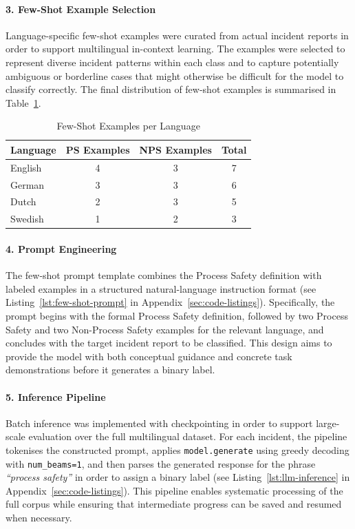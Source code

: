 \documentclass[11pt, titlepage, bibliography=totoc]{scrreprt}
\begin{document}
\paragraph{3. Few-Shot Example Selection}
Language-specific few-shot examples were curated from actual incident reports in order to support multilingual in-context learning. The examples were selected to represent diverse incident patterns within each class and to capture potentially ambiguous or borderline cases that might otherwise be difficult for the model to classify correctly. The final distribution of few-shot examples is summarised in Table~\ref{tab:few-shot-examples}.

\begin{table}[htbp]
\centering
\caption{Few-Shot Examples per Language}
\label{tab:few-shot-examples}
\begin{tabular}{@{}lccc@{}}
\toprule
\textbf{Language} & \textbf{PS Examples} & \textbf{NPS Examples} & \textbf{Total} \\
\midrule
English & 4 & 3 & 7 \\
German & 3 & 3 & 6 \\
Dutch & 2 & 3 & 5 \\
Swedish & 1 & 2 & 3 \\
\bottomrule
\end{tabular}
\end{table}

\paragraph{4. Prompt Engineering}
The few-shot prompt template combines the Process Safety definition with labeled examples in a structured natural-language instruction format (see Listing~\ref{lst:few-shot-prompt} in Appendix~\ref{sec:code-listings}). Specifically, the prompt begins with the formal Process Safety definition, followed by two Process Safety and two Non-Process Safety examples for the relevant language, and concludes with the target incident report to be classified. This design aims to provide the model with both conceptual guidance and concrete task demonstrations before it generates a binary label.

\paragraph{5. Inference Pipeline}
Batch inference was implemented with checkpointing in order to support large-scale evaluation over the full multilingual dataset. For each incident, the pipeline tokenises the constructed prompt, applies \texttt{model.generate} using greedy decoding with \texttt{num\_beams=1}, and then parses the generated response for the phrase \textit{``process safety''} in order to assign a binary label (see Listing~\ref{lst:llm-inference} in Appendix~\ref{sec:code-listings}). This pipeline enables systematic processing of the full corpus while ensuring that intermediate progress can be saved and resumed when necessary.
\end{document}
